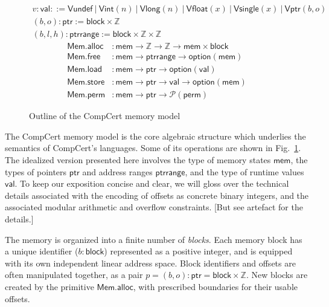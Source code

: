 \documentclass[acmsmall,timestamp,review,anonymous]{acmart}
\newcommand{\kw}[1]{\ensuremath{ \mathsf{#1} }}
\newcommand{\alt}{\ |\ } %
\begin{document}
\begin{figure} %
  \begin{gather*}
    v : \kw{val} ::=
      \kw{Vundef} \alt
      \kw{Vint}(n) \alt
      \kw{Vlong}(n) \alt
      \kw{Vfloat}(x) \alt
      \kw{Vsingle}(x) \alt
      \kw{Vptr}(b, o)
    \\
    (b, o) : \kw{ptr} :=
      \kw{block} \times \mathbb{Z}
    \\
    (b, l, h) : \kw{ptrrange} :=
      \kw{block} \times \mathbb{Z} \times \mathbb{Z}
  \end{gather*}
  \begin{align*}
    \kw{Mem.alloc} &:
      \kw{mem} \rightarrow \mathbb{Z} \rightarrow \mathbb{Z} \rightarrow
      \kw{mem} \times \kw{block}
    \\
    \kw{Mem.free} &:
      \kw{mem} \rightarrow
      \kw{ptrrange} \rightarrow
      \kw{option}(\kw{mem})
    \\
    \kw{Mem.load} &:
      \kw{mem} \rightarrow \kw{ptr} \rightarrow \kw{option}(\kw{val})
    \\
    \kw{Mem.store} &:
      \kw{mem} \rightarrow \kw{ptr} \rightarrow \kw{val} \rightarrow \kw{option}(\kw{mem})
    \\
    \kw{Mem.perm} &:
      \kw{mem} \rightarrow \kw{ptr} \rightarrow \mathcal{P}(\kw{perm})
  \end{align*}
  \caption{Outline of the CompCert memory model}
  \label{fig:mm}
\end{figure}

The CompCert memory model \cite{compcertmmv2}
is the core algebraic structure
which underlies the semantics of CompCert's languages.
Some of its operations
are shown in Fig.~\ref{fig:mm}.
The idealized version presented here
involves
the type of memory states \kw{mem},
the types of pointers \kw{ptr} and address ranges \kw{ptrrange}, and
the type of runtime values \kw{val}.
To keep our exposition concise and clear,
we will gloss over the technical details
associated with the encoding of offsets
as concrete binary integers,
and the associated modular arithmetic and overflow constraints.
[But see artefact for the details.]

The memory is organized into a finite number of \emph{blocks}.
Each memory block has a unique identifier ($b : \kw{block}$)
represented as a positive integer,
and is equipped with its own independent linear address space.
Block identifiers and offsets are often manipulated together,
as a pair $p = (b, o) : \kw{ptr} = \kw{block} \times \mathbb{Z}$.
New blocks are created by the primitive $\kw{Mem.alloc}$,
with prescribed boundaries for their usable offsets.
\end{document}
